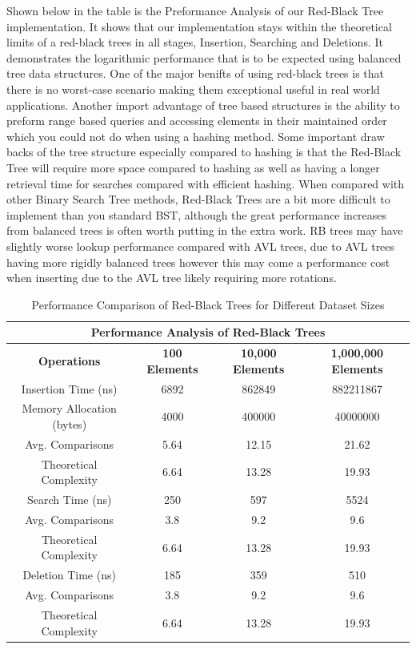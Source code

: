 \documentclass[12pt]{amsart}
\begin{document}
    Shown below in the table is the Preformance Analysis of our Red-Black Tree implementation.
    It shows that our implementation stays within the theoretical limits of a red-black trees
    in all stages, Insertion, Searching and Deletions. It demonstrates the logarithmic performance
    that is to be expected using balanced tree data structures. One of the major benifts of 
    using red-black trees is that there is no worst-case scenario making them exceptional useful
    in real world applications. Another import advantage of tree based structures is the ability to
    preform range based queries and accessing elements in their maintained order which you could not 
    do when using a hashing method. Some important draw backs of the tree structure especially compared
    to hashing is that the Red-Black Tree will require more space compared to hashing as well as having
    a longer retrieval time for searches compared with efficient hashing. 
    When compared with other Binary Search Tree methods,
    Red-Black Trees are a bit more difficult to implement than you standard BST, although the great
    performance increases from balanced trees is often worth putting in the extra work. RB trees 
    may have slightly worse lookup performance compared with AVL trees, due to AVL trees having
    more rigidly balanced trees however this may come a performance cost when inserting due to the
    AVL tree likely requiring more rotations. 

    \begin{table}[h]
        \centering
        \setlength{\tabcolsep}{6pt}
        \renewcommand{\arraystretch}{1.2}
        \begin{tabular}{|c|c|c|c|}
            \hline
            \multicolumn{4}{|c|}{\textbf{Performance Analysis of Red-Black Trees}} \\ \hline
            \textbf{Operations} & \textbf{100 Elements} & \textbf{10,000 Elements} & \textbf{1,000,000 Elements} \\ \hline
            Insertion Time (ns) & 6892 & 862849 & 882211867 \\
            Memory Allocation (bytes) & 4000 & 400000 & 40000000 \\
            Avg. Comparisons & 5.64 & 12.15 & 21.62 \\
            Theoretical Complexity & 6.64 & 13.28 & 19.93 \\ \hline
            Search Time (ns) & 250 & 597 & 5524 \\
            Avg. Comparisons & 3.8 & 9.2 & 9.6 \\
            Theoretical Complexity & 6.64 & 13.28 & 19.93 \\ \hline
            Deletion Time (ns) & 185 & 359 & 510 \\
            Avg. Comparisons & 3.8 & 9.2 & 9.6 \\
            Theoretical Complexity & 6.64 & 13.28 & 19.93 \\ \hline
        \end{tabular}
        \caption{Performance Comparison of Red-Black Trees for Different Dataset Sizes}
        \label{tab:rbt_performance}
    \end{table}
\end{document}
